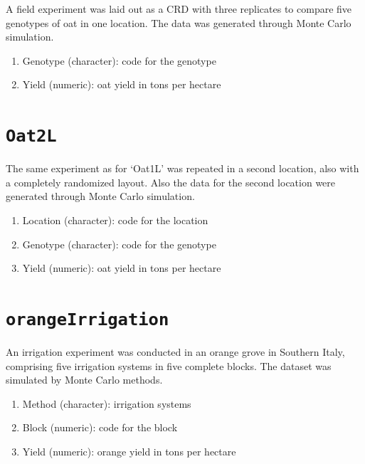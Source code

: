 \documentclass[
  letterpaper,
  DIV=11,
  numbers=noendperiod]{scrreprt}
\providecommand{\tightlist}{%
  \setlength{\itemsep}{0pt}\setlength{\parskip}{0pt}}
\begin{document}

A field experiment was laid out as a CRD with three replicates to
compare five genotypes of oat in one location. The data was generated
through Monte Carlo simulation.

\begin{enumerate}
\def\labelenumi{\arabic{enumi}.}
\tightlist
\item
  Genotype (character): code for the genotype
\item
  Yield (numeric): oat yield in tons per hectare
\end{enumerate}

\section*{\texorpdfstring{\texttt{Oat2L}}{Oat2L}}\label{oat2l}


The same experiment as for `Oat1L' was repeated in a second location,
also with a completely randomized layout. Also the data for the second
location were generated through Monte Carlo simulation.

\begin{enumerate}
\def\labelenumi{\arabic{enumi}.}
\tightlist
\item
  Location (character): code for the location
\item
  Genotype (character): code for the genotype
\item
  Yield (numeric): oat yield in tons per hectare
\end{enumerate}

\section*{\texorpdfstring{\texttt{orangeIrrigation}}{orangeIrrigation}}\label{orangeirrigation}


An irrigation experiment was conducted in an orange grove in Southern
Italy, comprising five irrigation systems in five complete blocks. The
dataset was simulated by Monte Carlo methods.

\begin{enumerate}
\def\labelenumi{\arabic{enumi}.}
\tightlist
\item
  Method (character): irrigation systems
\item
  Block (numeric): code for the block
\item
  Yield (numeric): orange yield in tons per hectare
\end{enumerate}
\end{document}
